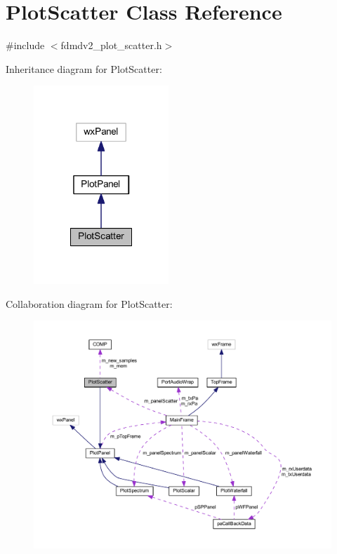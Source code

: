 \hypertarget{class_plot_scatter}{\section{Plot\-Scatter Class Reference}
\label{class_plot_scatter}
}


{\ttfamily \#include $<$fdmdv2\-\_\-plot\-\_\-scatter.\-h$>$}



Inheritance diagram for Plot\-Scatter\-:\nopagebreak
\begin{figure}[H]
\begin{center}
\leavevmode
\includegraphics[width=144pt]{class_plot_scatter__inherit__graph}
\end{center}
\end{figure}


Collaboration diagram for Plot\-Scatter\-:
\nopagebreak
\begin{figure}[H]
\begin{center}
\leavevmode
\includegraphics[width=350pt]{class_plot_scatter__coll__graph}
\end{center}
\end{figure}
